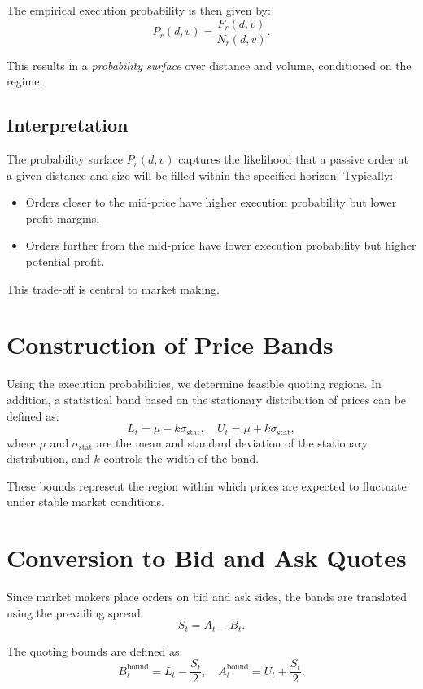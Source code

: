 \documentclass[12pt,a4paper]{report}
\begin{document}
The empirical execution probability is then given by:
\[
P_r(d,v) = \frac{F_r(d,v)}{N_r(d,v)}.
\]

This results in a \textit{probability surface} over distance and volume, conditioned on the regime.

\subsection{Interpretation}

The probability surface $P_r(d,v)$ captures the likelihood that a passive order at a given distance and size will be filled within the specified horizon. Typically:

\begin{itemize}
    \item Orders closer to the mid-price have higher execution probability but lower profit margins.
    \item Orders further from the mid-price have lower execution probability but higher potential profit.
\end{itemize}

This trade-off is central to market making.

\section{Construction of Price Bands}

Using the execution probabilities, we determine feasible quoting regions. In addition, a statistical band based on the stationary distribution of prices can be defined as:
\[
L_t = \mu - k\sigma_{\text{stat}}, \quad U_t = \mu + k\sigma_{\text{stat}},
\]
where $\mu$ and $\sigma_{\text{stat}}$ are the mean and standard deviation of the stationary distribution, and $k$ controls the width of the band.

These bounds represent the region within which prices are expected to fluctuate under stable market conditions.

\section{Conversion to Bid and Ask Quotes}

Since market makers place orders on bid and ask sides, the bands are translated using the prevailing spread:
\[
S_t = A_t - B_t.
\]

The quoting bounds are defined as:
\[
B_t^{\text{bound}} = L_t - \frac{S_t}{2}, \quad
A_t^{\text{bound}} = U_t + \frac{S_t}{2}.
\]
\end{document}
